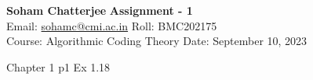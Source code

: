 \documentclass[a4paper, 11pt]{article}
\begin{document}

\textsf{\noindent \large\textbf{Soham Chatterjee} \hfill \textbf{Assignment - 1}\\
    Email: \href{sohamc@cmi.ac.in}{sohamc@cmi.ac.in} \hfill Roll: BMC202175\\
    \normalsize Course: Algorithmic Coding Theory \hfill Date: September 10, 2023}


\begin{problem}{%
		Chapter 1
}{p1
}
Ex 1.18
\end{problem}
\end{document}

